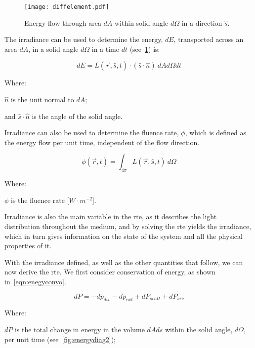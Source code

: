 \begin{figure}[!htb]
	\centering
	\texttt{[image: diffelement.pdf]}
	\caption{Energy flow through area $dA$ within solid angle $d\Omega$ in a direction $\hat{s}$.}
	\label{fig:energydiag1}
\end{figure}

The irradiance can be used to determine the energy, $dE$, transported across an area $dA$, in a solid angle $d\Omega$ in a time $dt$ (see~\cref{fig:energydiag1}) is:

\begin{equation}
	dE = L(\vec{r},\hat{s},t) \cdot (\hat{s} \cdot \hat{n})\ dAd\Omega dt
\end{equation}

\noindent Where:

\indent $\hat{n}$ is the unit normal to $dA$;

\indent and $\hat{s}\cdot\hat{n}$ is the angle of the solid angle.

\medskip

Irradiance can also be used to determine the fluence rate, $\phi$, which is defined as the energy flow per unit time, independent of the flow direction.

\begin{equation}
	\phi(\vec{r},t)=\int_{4\pi}L(\vec{r},\hat{s},t)\ d\Omega
\end{equation}

\noindent Where:

\indent $\phi$ is the fluence rate [$W \cdot m^{-2}$].

\medskip

Irradiance is also the main variable in the \gls{rte}, as it describes the light distribution throughout the medium, and by solving the \gls{rte} yields the irradiance, which in turn gives information on the state of the system and all the physical properties of it.

With the irradiance defined, as well as the other quantities that follow, we can now derive the \gls{rte}. We first consider conservation of energy, as shown in~\cref{eqn:enegyconvo}.

\begin{equation}
	dP = -dp_{div} - dp_{ext} + dP_{scatt} + dP_{src}
	\label{eqn:enegyconvo}
\end{equation}

\noindent Where:

\indent $dP$ is the total change in energy in the volume $dAds$ within the solid angle, $d\Omega$, per unit time (see~\cref{fig:energydiag2});

